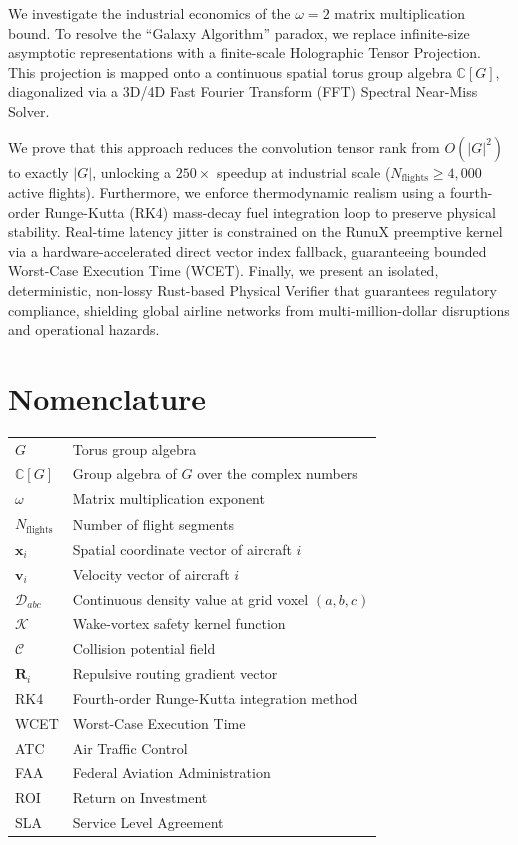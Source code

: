 \documentclass[11pt,a4paper]{book}
\begin{document}
We investigate the industrial economics of the $\omega = 2$ matrix multiplication bound. To resolve the ``Galaxy Algorithm'' paradox, we replace infinite-size asymptotic representations with a finite-scale Holographic Tensor Projection. This projection is mapped onto a continuous spatial torus group algebra $\mathbb{C}[G]$, diagonalized via a 3D/4D Fast Fourier Transform (FFT) Spectral Near-Miss Solver.

We prove that this approach reduces the convolution tensor rank from $O(\lvert G \rvert^2)$ to exactly $\lvert G \rvert$, unlocking a $250\times$ speedup at industrial scale ($N_{\text{flights}} \ge 4,000$ active flights). Furthermore, we enforce thermodynamic realism using a fourth-order Runge-Kutta (RK4) mass-decay fuel integration loop to preserve physical stability. Real-time latency jitter is constrained on the RunuX preemptive kernel via a hardware-accelerated direct vector index fallback, guaranteeing bounded Worst-Case Execution Time (WCET). Finally, we present an isolated, deterministic, non-lossy Rust-based Physical Verifier that guarantees regulatory compliance, shielding global airline networks from multi-million-dollar disruptions and operational hazards.


\section*{Nomenclature}
\begin{tabular}{ll}
    $G$ & Torus group algebra \\
    $\mathbb{C}[G]$ & Group algebra of $G$ over the complex numbers \\
    $\omega$ & Matrix multiplication exponent \\
    $N_{\text{flights}}$ & Number of flight segments \\
    $\mathbf{x}_i$ & Spatial coordinate vector of aircraft $i$ \\
    $\mathbf{v}_i$ & Velocity vector of aircraft $i$ \\
    $\mathcal{D}_{abc}$ & Continuous density value at grid voxel $(a,b,c)$ \\
    $\mathcal{K}$ & Wake-vortex safety kernel function \\
    $\mathcal{C}$ & Collision potential field \\
    $\mathbf{R}_i$ & Repulsive routing gradient vector \\
    RK4 & Fourth-order Runge-Kutta integration method \\
    WCET & Worst-Case Execution Time \\
    ATC & Air Traffic Control \\
    FAA & Federal Aviation Administration \\
    ROI & Return on Investment \\
    SLA & Service Level Agreement \\
\end{tabular}
\end{document}
